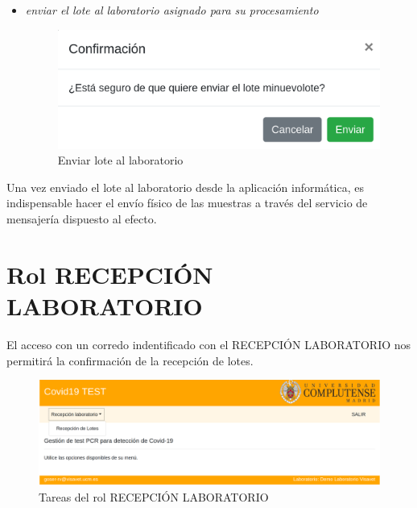 \documentclass[a4paper,spanish]{paper}
\begin{document}
\begin{itemize}
    
    \item \emph{enviar el lote al laboratorio asignado para su procesamiento}
    
\begin{figure}[h]
\centering
\includegraphics[scale=0.6]{Figs/Fig9.png}
\caption{Enviar lote al laboratorio}
\label{Fig9}
\end{figure}

    
\end{itemize}

\medskip
\begin{tcolorbox}[colback=blue!3!white,colframe=blue(ryb)!50!black,title=\textbf{Tip}]

Una vez enviado el lote al laboratorio desde la aplicación informática, es indispensable hacer el envío físico de las muestras a través del servicio de mensajería dispuesto al efecto.

\end{tcolorbox}

\section{Rol RECEPCIÓN LABORATORIO}

El acceso con un corredo indentificado con el RECEPCIÓN LABORATORIO nos permitirá la confirmación de la recepción de lotes.

\begin{figure}[h]
\centering
\includegraphics[scale=0.6]{Figs/Fig10.png}
\caption{Tareas del rol RECEPCIÓN LABORATORIO}
\label{Fig10}
\end{figure}
\end{document}
